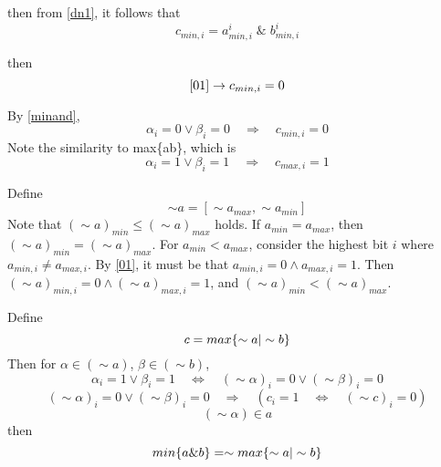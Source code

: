 \documentclass{article}
\begin{document}
then from \eqref{dn1}, it follows that 
\begin{equation}\label{minand}
c_{min,i} = a^i_{min,i} \; \text{\&}\; b^i_{min,i}
\end{equation}

then
\begin{equation*}
\eqref{01} \rightarrow c_{min,i} = 0
\end{equation*}

By \eqref{minand},
\begin{equation*}
\alpha_i = 0 \vee \beta_i = 0 \quad \Rightarrow \quad c_{min,i} = 0
\end{equation*}
Note the similarity to max\{a\textbar b\}, which is
\begin{equation*}
\alpha_i = 1 \vee \beta_i = 1 \quad \Rightarrow \quad c_{max,i} = 1
\end{equation*}

Define 
\begin{equation*}
\sim a = [\sim a_{max}, \sim a_{min}]
\end{equation*}
Note that $(\sim a)_{min} \le (\sim a)_{max}$ holds. 
If $a_{min} = a_{max}$, then 
$(\sim a)_{min} = (\sim a)_{max}$.
For $a_{min} < a_{max}$, consider the highest bit $i$ where 
$a_{min,i} \ne a_{max,i}$. By \eqref{01}, it must be that 
$a_{min,i} = 0 \wedge a_{max,i} = 1$. 
Then
$(\sim a)_{min,i} = 0 \wedge (\sim a)_{max,i} = 1$, and 
$(\sim a)_{min} < (\sim a)_{max}$. 

Define
\begin{equation*}
c = max\{\sim a \text{\textbar} \sim b\}
\end{equation*}
Then for $\alpha \in (\sim a)$, $\beta \in (\sim b)$,
\begin{equation*}
\alpha_i = 1 \vee \beta_i = 1 \quad \Leftrightarrow \quad 
(\sim \alpha)_i = 0 \vee (\sim \beta)_i = 0
\end{equation*}
\begin{equation*}
(\sim \alpha)_i = 0 \vee (\sim \beta)_i = 0 \quad \Rightarrow \quad 
(c_i = 1 \quad \Leftrightarrow \quad (\sim c)_i = 0)
\end{equation*}
\begin{equation*}
(\sim \alpha) \in a
\end{equation*}
then
\begin{equation}
min\{a\text{\&}b\} = 
\sim max\{\sim a \text{\textbar} \sim b\}
\end{equation}
\end{document}
